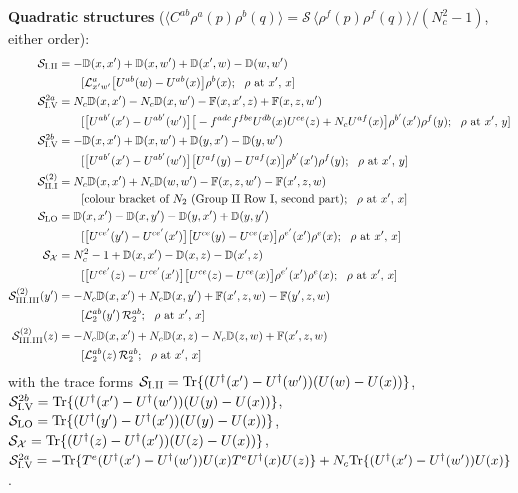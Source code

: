 \documentclass[10pt]{article}
\def\mf#1{\mathbb{#1}}
\begin{document}
\noindent\textbf{Quadratic structures} ($\langle C^{ab}\rho^{a}(p)\rho^{b}(q)\rangle=\mathcal{S}\,\langle\rho^{f}(p)\rho^{f}(q)\rangle/(N_{c}^{2}-1)$, either order):
\begin{align}
\mathcal{S}_{\rm I.II}&=-\mf{D}(x,x')+\mf{D}(x,w')+\mf{D}(x',w)-\mf{D}(w,w')\notag\\&\qquad[\mathcal{L}^{a}_{x'w'}\big[U^{ab}(w)-U^{ab}(x)\big]\rho^{b}(x);\ \ \rho\text{ at }x',\,x]\notag\\
\mathcal{S}_{\rm I.V}^{2a}&=N_{c}\mf{D}(x,x')-N_{c}\mf{D}(x,w')-\mf{F}(x,x',z)+\mf{F}(x,z,w')\notag\\&\qquad[\big[U^{ab'}(x')-U^{ab'}(w')\big]\big[-f^{adc}f^{fbe}U^{db}(x)U^{ce}(z)+N_{c}U^{af}(x)\big]\rho^{b'}(x')\rho^{f}(y);\ \ \rho\text{ at }x',\,y]\notag\\
\mathcal{S}_{\rm I.V}^{2b}&=-\mf{D}(x,x')+\mf{D}(x,w')+\mf{D}(y,x')-\mf{D}(y,w')\notag\\&\qquad[\big[U^{ab'}(x')-U^{ab'}(w')\big]\big[U^{af}(y)-U^{af}(x)\big]\rho^{b'}(x')\rho^{f}(y);\ \ \rho\text{ at }x',\,y]\notag\\
\mathcal{S}_{\rm II.I}^{(2)}&=N_{c}\mf{D}(x,x')+N_{c}\mf{D}(w,w')-\mf{F}(x,z,w')-\mf{F}(x',z,w)\notag\\&\qquad[\text{colour bracket of } N_{2}\text{ (Group II Row I, second part)};\ \ \rho\text{ at }x',\,x]\notag\\
\mathcal{S}_{\rm LO}&=\mf{D}(x,x')-\mf{D}(x,y')-\mf{D}(y,x')+\mf{D}(y,y')\notag\\&\qquad[\big[U^{ce'}(y')-U^{ce'}(x')\big]\big[U^{ce}(y)-U^{ce}(x)\big]\rho^{e'}(x')\rho^{e}(x);\ \ \rho\text{ at }x',\,x]\notag\\
\mathcal{S}_{\mathcal{X}}&=N_{c}^{2}-1+\mf{D}(x,x')-\mf{D}(x,z)-\mf{D}(x',z)\notag\\&\qquad[\big[U^{ce'}(z)-U^{ce'}(x')\big]\big[U^{ce}(z)-U^{ce}(x)\big]\rho^{e'}(x')\rho^{e}(x);\ \ \rho\text{ at }x',\,x]\notag\\
\mathcal{S}_{\rm III.III}^{(2)}(y')&=-N_{c}\mf{D}(x,x')+N_{c}\mf{D}(x,y')+\mf{F}(x',z,w)-\mf{F}(y',z,w)\notag\\&\qquad[\mathcal{L}_{2}^{ab}(y')\,\mathcal{R}_{2}^{ab};\ \ \rho\text{ at }x',\,x]\notag\\
\mathcal{S}_{\rm III.III}^{(2)}(z)&=-N_{c}\mf{D}(x,x')+N_{c}\mf{D}(x,z)-N_{c}\mf{D}(z,w)+\mf{F}(x',z,w)\notag\\&\qquad[\mathcal{L}_{2}^{ab}(z)\,\mathcal{R}_{2}^{ab};\ \ \rho\text{ at }x',\,x]\notag
\end{align}
with the trace forms $\mathcal{S}_{\rm I.II}={\rm Tr}\{(U^{\dagger}(x')-U^{\dagger}(w'))(U(w)-U(x))\}$, $\mathcal{S}_{\rm I.V}^{2b}={\rm Tr}\{(U^{\dagger}(x')-U^{\dagger}(w'))(U(y)-U(x))\}$, $\mathcal{S}_{\rm LO}={\rm Tr}\{(U^{\dagger}(y')-U^{\dagger}(x'))(U(y)-U(x))\}$, $\mathcal{S}_{\mathcal{X}}={\rm Tr}\{(U^{\dagger}(z)-U^{\dagger}(x'))(U(z)-U(x))\}$, $\mathcal{S}^{2a}_{\rm I.V}=-{\rm Tr}\{T^{e}(U^{\dagger}(x')-U^{\dagger}(w'))U(x)T^{e}U^{\dagger}(x)U(z)\}+N_{c}{\rm Tr}\{(U^{\dagger}(x')-U^{\dagger}(w'))U(x)\}$.\par
\end{document}
